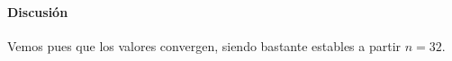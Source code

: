 \begin{table}[H]
	\centering
\end{table}

\paragraph{Discusión}

Vemos pues que los valores convergen, siendo bastante estables a partir $n = 32$.
